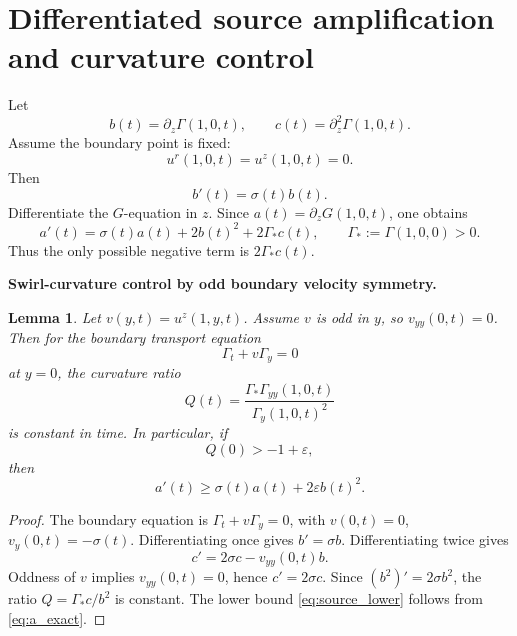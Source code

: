 \documentclass[11pt]{amsart}
\newtheorem{lemma}[theorem]{Lemma}
\begin{document}
\section{Differentiated source amplification and curvature control}

Let
\begin{equation}\label{eq:b_c_def}
b(t)=\partial_z\Gamma(1,0,t),
\qquad
c(t)=\partial_z^2\Gamma(1,0,t).
\end{equation}
Assume the boundary point is fixed:
\[
u^r(1,0,t)=u^z(1,0,t)=0.
\]
Then
\begin{equation}\label{eq:b_eq}
b'(t)=\sigma(t)b(t).
\end{equation}
Differentiate the \(G\)-equation in \(z\).  Since \(a(t)=\partial_zG(1,0,t)\), one obtains
\begin{equation}\label{eq:a_exact}
a'(t)=\sigma(t)a(t)+2b(t)^2+2\Gamma_*c(t),
\qquad
\Gamma_*:=\Gamma(1,0,0)>0.
\end{equation}
Thus the only possible negative term is \(2\Gamma_*c(t)\).

\medskip
\noindent\textbf{Swirl-curvature control by odd boundary velocity symmetry.}
\begin{lemma}\label{lem:swirl_curvature}
Let \(v(y,t)=u^z(1,y,t)\).  Assume \(v\) is odd in \(y\), so \(v_{yy}(0,t)=0\).  Then for the boundary transport equation
\[
\Gamma_t+v\Gamma_y=0
\]
at \(y=0\), the curvature ratio
\begin{equation}\label{eq:Q_curv}
Q(t)=\frac{\Gamma_*\Gamma_{yy}(1,0,t)}{\Gamma_y(1,0,t)^2}
\end{equation}
is constant in time.  In particular, if
\[
Q(0)>-1+\varepsilon,
\]
then
\begin{equation}\label{eq:source_lower}
a'(t)
\ge
\sigma(t)a(t)+2\varepsilon b(t)^2.
\end{equation}
\end{lemma}

\begin{proof}
The boundary equation is \(\Gamma_t+v\Gamma_y=0\), with \(v(0,t)=0\), \(v_y(0,t)=-\sigma(t)\).  Differentiating once gives \(b'=\sigma b\).  Differentiating twice gives
\[
c'=2\sigma c-v_{yy}(0,t)b.
\]
Oddness of \(v\) implies \(v_{yy}(0,t)=0\), hence \(c'=2\sigma c\).  Since \((b^2)'=2\sigma b^2\), the ratio \(Q=\Gamma_*c/b^2\) is constant.  The lower bound \eqref{eq:source_lower} follows from \eqref{eq:a_exact}.
\end{proof}
\end{document}
